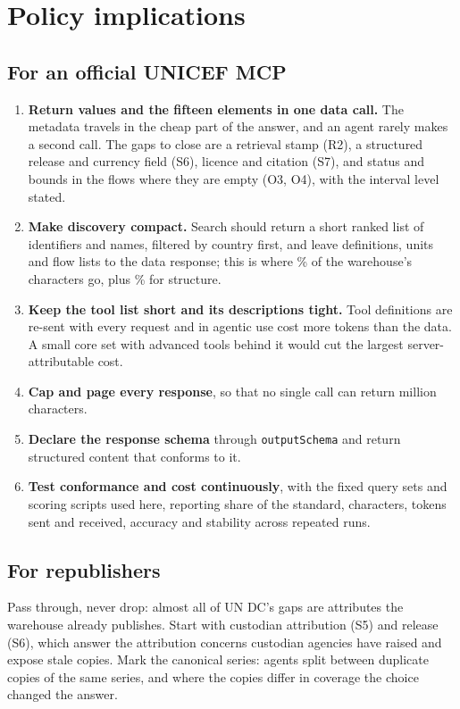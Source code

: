 \documentclass[11pt,a4paper]{article}
\begin{document}
\section{Policy implications}\label{sec:policy}

\subsection{For an official UNICEF MCP}
\begin{enumerate}
\item \textbf{Return values and the fifteen elements in one data call.} The metadata travels in the cheap part of the answer, and an agent rarely makes a second call. The gaps to close are a retrieval stamp (R2), a structured release and currency field (S6), licence and citation (S7), and status and bounds in the flows where they are empty (O3, O4), with the interval level stated.
\item \textbf{Make discovery compact.} Search should return a short ranked list of identifiers and names, filtered by country first, and leave definitions, units and flow lists to the data response; this is where \discWh\% of the warehouse's characters go, plus \structWh\% for structure.
\item \textbf{Keep the tool list short and its descriptions tight.} Tool definitions are re-sent with every request and in agentic use cost more tokens than the data. A small core set with advanced tools behind it would cut the largest server-attributable cost.
\item \textbf{Cap and page every response}, so that no single call can return \oversizedM{} million characters.
\item \textbf{Declare the response schema} through \texttt{outputSchema} and return structured content that conforms to it.
\item \textbf{Test conformance and cost continuously}, with the fixed query sets and scoring scripts used here, reporting share of the standard, characters, tokens sent and received, accuracy and stability across repeated runs.
\end{enumerate}

\subsection{For republishers}
Pass through, never drop: almost all of UN DC's gaps are attributes the warehouse already publishes. Start with custodian attribution (S5) and release (S6), which answer the attribution concerns custodian agencies have raised and expose stale copies. Mark the canonical series: agents split between duplicate copies of the same series, and where the copies differ in coverage the choice changed the answer.
\end{document}
